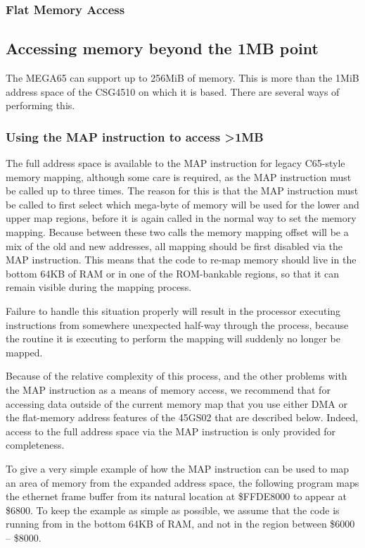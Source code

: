 \subsubsection{Flat Memory Access}

\subsection{Accessing memory beyond the 1MB point}
\label{sec:extended-memory}

The MEGA65 can support up to 256MiB of memory. This is more than the 1MiB address space of the CSG4510
on which it is based. There are several ways of performing this.

\subsubsection{Using the MAP instruction to access >1MB}

The full address space is available to the MAP instruction for legacy C65-style memory
mapping, although some care is required, as the MAP instruction must be called up to three times.
The reason for this is that the MAP instruction must be called to first select which mega-byte of
memory will be used for the lower and upper map regions, before it is again called in the normal
way to set the memory mapping.  Because between these two calls the memory mapping offset will be
a mix of the old and new addresses, all mapping should be first disabled via the MAP instruction.
This means that the code to re-map memory should live in the bottom 64KB of RAM or in one of the
ROM-bankable regions, so that it can remain visible during the mapping process.

Failure to handle this situation properly will result in the processor executing instructions
from somewhere unexpected half-way through the process, because the routine it is executing
to perform the mapping will suddenly no longer be mapped.

Because of the relative complexity of this process, and the other problems with the MAP instruction
as a means of memory access, we recommend that for accessing data outside of the current memory
map that you use either DMA or the flat-memory address features of the 45GS02 that are described below.
Indeed, access to the full address space via the MAP instruction is only provided for completeness.

To give a very simple example of how the MAP instruction can be used to map an area of memory from
the expanded address space, the following program maps the ethernet frame buffer from its natural location
at \$FFDE8000 to appear at \$6800.  To keep the example as simple as possible, we assume that the code
is running from in the bottom 64KB of RAM, and not in the region between \$6000 -- \$8000.

